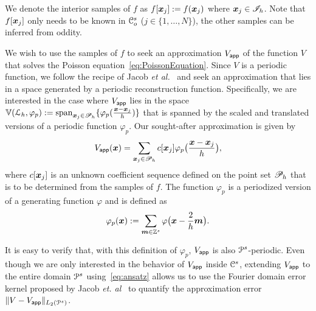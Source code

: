 We denote the interior samples of $f$ as $f[\boldsymbol{x}_j] :=
f(\boldsymbol{x}_j)$ where $\boldsymbol{x}_j \in \mathscr{I}_h$. Note that
$f[\boldsymbol{x}_j]$ only needs to be known in $\mathcal{C}_o^s$ ($j \in
\{1,\ldots,N\}$), the other samples can be inferred from
oddity. 

We wish to use the samples of $f$ to seek an approximation $V_{\mathsf{app}}$ of the
function $V$ that solves the Poisson equation~\eqref{eq:PoissonEquation}. Since
$V$ is a periodic function, we follow the recipe of Jacob \textit{et
al.}~\cite{jacob02} and seek an approximation that lies in a space generated by
a periodic reconstruction function. Specifically, we are interested in the case
where $V_{\mathsf{app}}$ lies in the space $\mathbb{V}({\mathcal{L}_h},{\varphi_p}) :=
\mathrm{span}_{\boldsymbol{x}_j\in\mathscr{P}_h}\{
\varphi_p(\frac{\boldsymbol{x}-\boldsymbol{x}_j}{h}) \}$ that is spanned by the scaled and
translated versions of a periodic function $\varphi_p$. Our sought-after
approximation is given by
\begin{equation}
  \appf{V}(\vect{x}) = \sum_{\vect{x}_j \in \pointset{P}_h} c[\vect{x}_j] 
\varphi_p\bigl(\frac{\vect{x} - \vect{x}_j}{h}\bigr),
\label{eq:ansatz}
\end{equation}
where $c[\boldsymbol{x}_j]$ is an unknown coefficient sequence defined on
the point set $\mathscr{P}_h$ that is to be determined from the
samples of $f$. The function
$\varphi_p$ is a periodized version of a generating function $\varphi$
and is defined as
\begin{equation}
\varphi_p(\vect{x}) := \sum_{\vect{m} \in \ints^s} 
\varphi\bigl(\vect{x} - \frac{2}{h} \vect{m} \bigr).
\label{eq:periodization}
\end{equation}


It is easy to verify that, with this definition of $\varphi_p$,
$V_{\mathsf{app}}$ is also $\mathcal{P}^s$-periodic. Even though we are only
interested in the behavior of $V_{\mathsf{app}}$ inside $\mathcal{C}^s$, extending
$V_{\mathsf{app}}$ to the entire domain $\mathcal{P}^s$ using~\eqref{eq:ansatz}
allows us to use the Fourier domain error kernel proposed by Jacob
\textit{et. al}~\cite{jacob02} to quantify the approximation error
$\lVert V - V_{\mathsf{app}} \rVert_{L_2(\mathcal{P}^s)}$.

